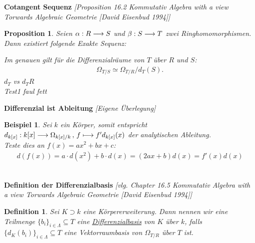 \documentclass[10pt,a4paper]{report}
\newcommand{\comment}[1]{}
\newcommand{\ModulsOfDifferenzials}{Kommutativ Algebra with a view Torwards Algebraic Geometrie [David Eisenbud 1994]}
\newcounter{Aussage}[chapter]
\newtheorem{prop}[Aussage]{Proposition}
\newtheorem{definition}[Aussage]{Definition}
\newtheorem{bsp}[Aussage]{Beispiel}
\newcommand{\functionfront}[3]{\nolinebreak{#1:#2 \longrightarrow #3}}
\newcommand{\function}[5]{\nolinebreak{#1:#2 \longrightarrow #3 \, , \, #4 \longmapsto #5}}
\newcommand{\divR}[2]{\Omega_{#1/#2}}
\newcommand{\divf}[1]{d_{#1}}
\newcommand{\test}[2][faul]{Test1 #1 #2}
\newcommand{\Tensor}[3]{#1 \otimes_{#2} #3}
\newcommand{\tensor}[3]{#1 \otimes #3}
\begin{document}
\textbf{Cotangent Sequenz} \textit{[Proposition 16.2 \ModulsOfDifferenzials]}
\begin{prop}\label{Cotangent Sequenz}
Seien $\functionfront{\alpha}{R}{S}$ und $\functionfront{\beta}{S}{T}$ zwei Ringhomomorphismen. Dann existiert folgende Exakte Sequenz:
\begin{center}
\end{center}
Im genauen gilt für die Differenzialräume von $T$ über $R$ und $S$:
\begin{gather*}
\divR{T}{S} \simeq \divR{T}{R}/\divf{T}(S).
\end{gather*}
$\divf{T}$ vs $\divf{T}{R}$ \\
\test{fett}
\end{prop}


\textbf{Differenzial ist Ableitung} \textit{[Eigene Überlegung]}
\begin{bsp}\comment{\label{Differenzial ist Ableitung}}
Sei $k$ ein Körper, somit entspricht $\function{\divf{k[x]}}{k[x]}{\divR{k[x]}{k}}{f}{f'\divf{k[x]}(x)}$ der analytischen Ableitung.\\
Teste dies an $f(x)=ax^2 + bx +c$:
\begin{gather*}
d(f(x)) = a \cdot d(x^2) + b \cdot d(x) = (2ax + b) d(x) = f'(x) d(x) 
\end{gather*}
\comment{lässt sich induktiv für Monome leicht zeigen}
\end{bsp}


\ \\
\textbf{Definition der Differenzialbasis} \textit{[vlg. Chapter 16.5 \ModulsOfDifferenzials]}
\begin{definition}\comment{\label{Definition der Differenzialbasis}}
Sei $K \supset k$ eine Körpererweiterung. Dann nennen wir eine Teilmenge $\lbrace b_i \rbrace_{i \in \Lambda} \subseteq T$ eine \underline{Differenzialbasis} von $K$ über $k$, falls $\lbrace \divf{K}(b_i)\rbrace_{i \in \Lambda} \subseteq T$ eine Vektorraumbasis von $\divR{T}{R}$ über $T$ ist.
\end{definition}
\end{document}
